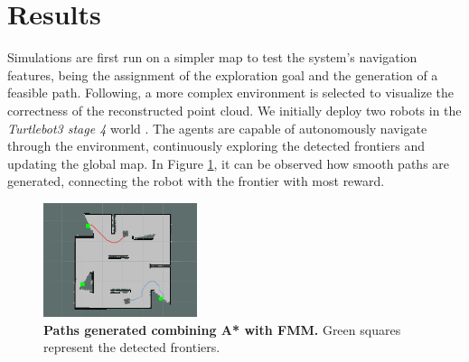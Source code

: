 \section{Results}
\label{sec:results}
Simulations are first run on a simpler map to test the system's navigation features, being the assignment of the exploration goal and the generation of a feasible path. Following, a more complex environment is selected to visualize the correctness of the reconstructed point cloud.
We initially deploy two robots in the \textit{Turtlebot3 stage 4} world \cite{turtlebot3-simulation}. The agents are capable of autonomously navigate through the environment, continuously exploring the detected frontiers and updating the global map. In Figure \ref{fig:path}, it can be observed how smooth paths are generated, connecting the robot with the frontier with most reward.

\begin{figure}[h]
  \begin{center}
    \includegraphics[width=0.4\textwidth]{img/path.png}
  \end{center}
  \caption[]{
    \textbf{Paths generated combining A* with FMM.} 
    Green squares represent the detected frontiers.
  }
  \label{fig:path}
\end{figure}

